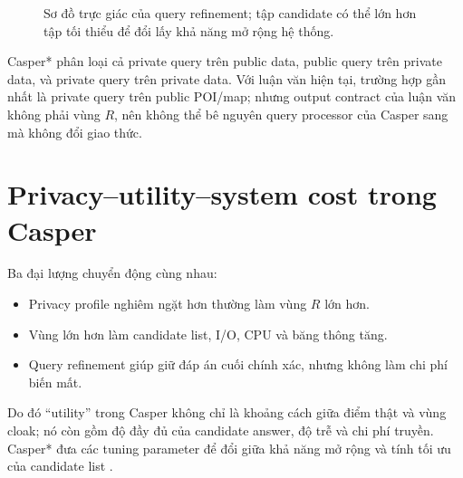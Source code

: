 \documentclass[11pt,a4paper,oneside]{report}
\begin{document}
\begin{figure}[htbp]
\centering
{}
\caption{Sơ đồ trực giác của query refinement; tập candidate có thể lớn hơn tập tối thiểu để đổi lấy khả năng mở rộng hệ thống.}
\label{fig:casper-candidates}
\end{figure}

Casper* phân loại cả private query trên public data, public query trên private data,
và private query trên private data. Với luận văn hiện tại, trường hợp gần nhất là
private query trên public POI/map; nhưng output contract của luận văn không phải
vùng $R$, nên không thể bê nguyên query processor của Casper sang mà không đổi
giao thức.

\section{Privacy--utility--system cost trong Casper}

Ba đại lượng chuyển động cùng nhau:

\begin{itemize}
  \item Privacy profile nghiêm ngặt hơn thường làm vùng $R$ lớn hơn.
  \item Vùng lớn hơn làm candidate list, I/O, CPU và băng thông tăng.
  \item Query refinement giúp giữ đáp án cuối chính xác, nhưng không làm chi phí biến mất.
\end{itemize}

Do đó ``utility'' trong Casper không chỉ là khoảng cách giữa điểm thật và vùng cloak;
nó còn gồm độ đầy đủ của candidate answer, độ trễ và chi phí truyền. Casper* đưa
các tuning parameter để đổi giữa khả năng mở rộng và tính tối ưu của candidate list
\cite{chow2009casper}.
\end{document}
